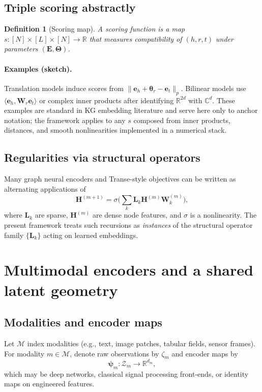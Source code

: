 \documentclass[11pt]{article}
\newtheorem{definition}{Definition}
\begin{document}
\subsection{Triple scoring abstractly}
\begin{definition}[Scoring map]
A \emph{scoring function} is a map $s : [N]\times[L]\times[N] \to \mathbb{R}$ that measures compatibility of $(h,r,t)$ under parameters $(\bm{E}, \bm{\Theta})$.
\end{definition}

\paragraph{Examples (sketch).}
Translation models induce scores from $\lVert \bm{e}_h + \bm{\theta}_r - \bm{e}_t \rVert_p$.
Bilinear models use $\langle \bm{e}_h , \bm{W}_r \bm{e}_t \rangle$ or complex inner products after identifying $\mathbb{R}^{2d}$ with $\mathbb{C}^d$.
These examples are standard in KG embedding literature and serve here only to anchor notation; the framework applies to any $s$ composed from inner products, distances, and smooth nonlinearities implemented in a numerical stack.

\subsection{Regularities via structural operators}
Many graph neural encoders and Transe-style objectives can be written as alternating applications of
\[
  \bm{H}^{(m+1)} = \sigma \Big( \sum_{k} \bm{L}_k \bm{H}^{(m)} \bm{W}_k^{(m)} \Big),
\]
where $\bm{L}_k$ are sparse, $\bm{H}^{(m)}$ are dense node features, and $\sigma$ is a nonlinearity.
The present framework treats such recursions as \emph{instances} of the structural operator family $\{ \bm{L}_k \}$ acting on learned embeddings.

\section{Multimodal encoders and a shared latent geometry}

\subsection{Modalities and encoder maps}
Let $\mathcal{M}$ index modalities (e.g., text, image patches, tabular fields, sensor frames).
For modality $m \in \mathcal{M}$, denote raw observations by $\zeta_m$ and encoder maps by
\begin{equation}
  \bm{\psi}_m : \mathcal{Z}_m \to \mathbb{R}^{d_m},
\end{equation}
which may be deep networks, classical signal processing front-ends, or identity maps on engineered features.
\end{document}
